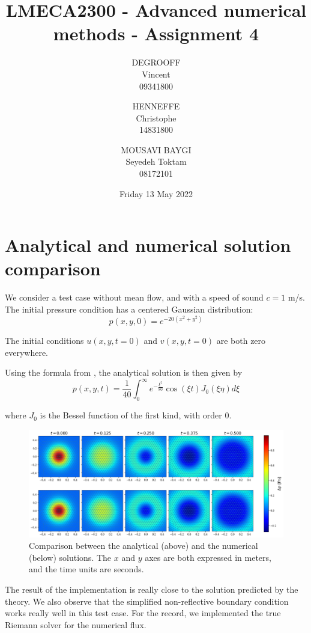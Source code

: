 \documentclass[11 pt]{article}
\title{LMECA2300 - Advanced numerical methods - Assignment 4}
\author{
    DEGROOFF\\ Vincent\\ 09341800
    \and
    HENNEFFE\\ Christophe\\ 14831800
    \and
    MOUSAVI BAYGI\\ Seyedeh Toktam\\ 08172101
}
\date{Friday 13 May 2022}
\begin{document}
\maketitle

\section{Analytical and numerical solution comparison}

We consider a test case without mean flow, and with a speed of sound $c=1$ m/s. The initial pressure condition has a centered Gaussian distribution:
\begin{equation*}
    p(x,y, 0) = e^{-20(x^2+y^2)}
\end{equation*}

The initial conditions $u(x,y,t=0)$ and $v(x,y, t=0)$ are both zero everywhere.

Using the formula from \cite{TAM1993262}, the analytical solution is then given by
\begin{equation*}
    p(x,y,t) = \frac{1}{40} \int_0^{\infty}e^{-\frac{\xi^2}{80}}\cos (\xi t) J_0(\xi \eta) d\xi
\end{equation*}

where $J_0$ is the Bessel function of the first kind, with order $0$.

\begin{figure}[H]
    \centering
    \includegraphics[width=\textwidth]{../figures/comparison.png}
    \caption{Comparison between the analytical (above) and the numerical (below) solutions. The $x$ and $y$ axes are both expressed in meters, and the time units are seconds.}
    \label{fig:comparison}
\end{figure}

The result of the implementation is really close to the solution predicted by the theory. We also observe that the simplified non-reflective boundary condition works really well in this test case. For the record, we implemented the true Riemann solver for the numerical flux.
\end{document}
